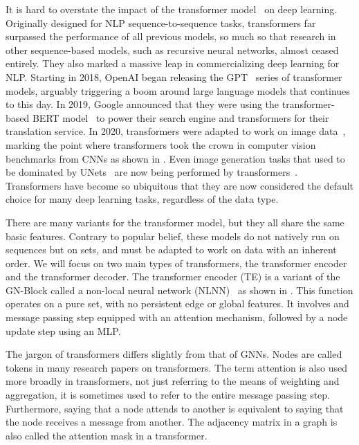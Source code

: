 It is hard to overstate the impact of the transformer model~\cite{Attention} on deep learning.
Originally designed for NLP sequence-to-sequence tasks, transformers far surpassed the performance of all previous models, so much so that research in other sequence-based models, such as recursive neural networks, almost ceased entirely.
They also marked a massive leap in commercializing deep learning for NLP.
Starting in 2018, OpenAI began releasing the GPT~\cite{GPT} series of transformer models, arguably triggering a boom around large language models that continues to this day.
In 2019, Google announced that they were using the transformer-based BERT model~\cite{BERT} to power their search engine and transformers for their translation service.
In 2020, transformers were adapted to work on image data~\cite{VisionTransformer}, marking the point where transformers took the crown in computer vision benchmarks from CNNs as shown in .
Even image generation tasks that used to be dominated by UNets~\cite{Unet, DiffusionBeatsGANS} are now being performed by transformers~\cite{DIT, SD3}.
Transformers have become so ubiquitous that they are now considered the default choice for many deep learning tasks, regardless of the data type.

There are many variants for the transformer model, but they all share the same basic features.
Contrary to popular belief, these models do not natively run on sequences but on sets, and must be adapted to work on data with an inherent order.
We will focus on two main types of transformers, the transformer encoder and the transformer decoder.
The transformer encoder (TE) is a variant of the GN-Block called a non-local neural network (NLNN)~\cite{NonlocalNeuralNetworks} as shown in .
This function operates on a pure set, with no persistent edge or global features.
It involves and message passing step equipped with an attention mechanism, followed by a node update step using an MLP\@.

The jargon of transformers differs slightly from that of GNNs.
Nodes are called tokens in many research papers on transformers.
The term attention is also used more broadly in transformers, not just referring to the means of weighting and aggregation, it is sometimes used to refer to the entire message passing step.
Furthermore, saying that a node attends to another is equivalent to saying that the node receives a message from another.
The adjacency matrix in a graph is also called the attention mask in a transformer.

